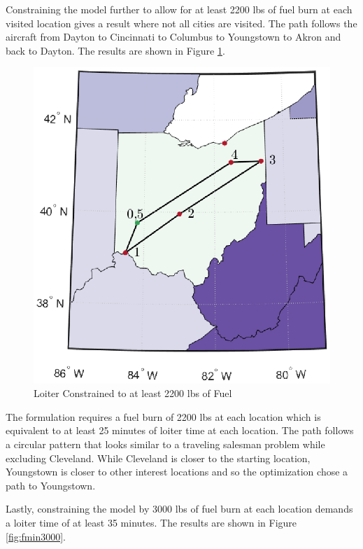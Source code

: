 Constraining the model further to allow for at least 2200 lbs of fuel burn at each visited location gives a result where not all cities are visited. The path follows the aircraft from Dayton to Cincinnati to Columbus to Youngstown to Akron and back to Dayton. The results are shown in Figure \ref{fig:fmin2200}.
\begin{figure}[h]
    \centering
    \includegraphics{Thesis/Method_II/fmin2200.eps}
    \caption{Loiter Constrained to at least 2200 lbs of Fuel}
    \label{fig:fmin2200}
\end{figure}
The formulation requires a fuel burn of 2200 lbs at each location which is equivalent to at least 25 minutes of loiter time at each location. The path follows a circular pattern that looks similar to a traveling salesman problem while excluding Cleveland. While Cleveland is closer to the starting location, Youngstown is closer to other interest locations and so the optimization chose a path to Youngstown.\par
Lastly, constraining the model by 3000 lbs of fuel burn at each location demands a loiter time of at least 35 minutes. The results are shown in Figure \ref{fig:fmin3000}.
